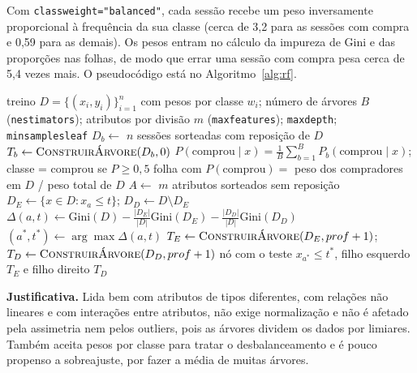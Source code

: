 \documentclass[11pt,a4paper]{article}
\DeclareRobustCommand{\atr}[1]{{\renewcommand{\_}{\textunderscore\allowbreak}\texttt{#1}}}
\begin{document}
Com \atr{class\_weight="balanced"}, cada sessão recebe um peso inversamente proporcional à frequência da sua classe
(cerca de 3,2 para as sessões com compra e 0,59 para as demais). Os pesos entram no cálculo da impureza de Gini e das
proporções nas folhas, de modo que errar uma sessão com compra pesa cerca de 5,4 vezes mais. O pseudocódigo está no
Algoritmo~\ref{alg:rf}.

\begin{algorithm}[H]
  \caption{Random Forest para classificação binária}
  \label{alg:rf}
  \small
  \begin{algorithmic}[1]
    \Require treino $D = \{(x_i, y_i)\}_{i=1}^{n}$ com pesos por classe $w_i$; número de árvores $B$
             (\atr{n\_estimators}); atributos por divisão $m$ (\atr{max\_features}); \atr{max\_depth};
             \atr{min\_samples\_leaf}
      \State $D_b \gets$ $n$ sessões sorteadas com reposição de $D$ 
      \State $T_b \gets \Call{ConstruirÁrvore}{D_b, 0}$
    \EndFor
    \Ensure $P(\text{comprou} \mid x) = \frac{1}{B}\sum_{b=1}^{B} P_b(\text{comprou} \mid x)$; classe = comprou se
            $P \ge 0{,}5$
    \Statex
        \State \Return folha com $P(\text{comprou}) =$ peso dos compradores em $D$ / peso total de $D$
      \EndIf
      \State $A \gets$ $m$ atributos sorteados sem reposição
        \State $D_E \gets \{x \in D : x_a \le t\}$; \quad $D_D \gets D \setminus D_E$
        \State $\Delta(a,t) \gets \mathrm{Gini}(D) - \frac{|D_E|}{|D|}\mathrm{Gini}(D_E) -
               \frac{|D_D|}{|D|}\mathrm{Gini}(D_D)$ 
      \EndFor
      \State $(a^*, t^*) \gets \arg\max \Delta(a,t)$
      \State $T_E \gets \Call{ConstruirÁrvore}{D_E, prof+1}$; \quad $T_D \gets \Call{ConstruirÁrvore}{D_D, prof+1}$
      \State \Return nó com o teste $x_{a^*} \le t^*$, filho esquerdo $T_E$ e filho direito $T_D$
    \EndFunction
  \end{algorithmic}
\end{algorithm}

\textbf{Justificativa.} Lida bem com atributos de tipos diferentes, com relações não lineares e com interações entre
atributos, não exige normalização e não é afetado pela assimetria nem pelos outliers, pois as árvores dividem os dados
por limiares. Também aceita pesos por classe para tratar o desbalanceamento e é pouco propenso a sobreajuste, por
fazer a média de muitas árvores.
\end{document}
